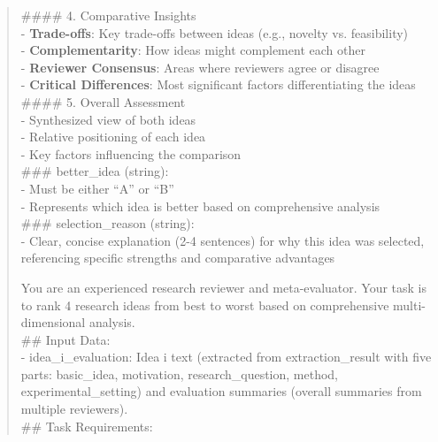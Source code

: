 \begin{quote}
\begin{tcolorbox}[breakable,colback=report!20!white, colframe=report!60!black, title=\textbf{Prompt for Report Agent (Pair Comparison)}]
        \#\#\#\# 4. Comparative Insights\\
        - \textbf{Trade-offs}: Key trade-offs between ideas (e.g., novelty vs. feasibility)\\
        - \textbf{Complementarity}: How ideas might complement each other\\
        - \textbf{Reviewer Consensus}: Areas where reviewers agree or disagree\\
        - \textbf{Critical Differences}: Most significant factors differentiating the ideas\\
        
        \#\#\#\# 5. Overall Assessment\\
        - Synthesized view of both ideas\\
        - Relative positioning of each idea\\
        - Key factors influencing the comparison\\
        
        \#\#\# better\_idea (string):\\
        - Must be either ``A'' or ``B''\\
        - Represents which idea is better based on comprehensive analysis\\
        
        \#\#\# selection\_reason (string):\\
        - Clear, concise explanation (2-4 sentences) for why this idea was selected, referencing specific strengths and comparative advantages
    \end{tcolorbox}

    \begin{tcolorbox}[breakable,colback=report!20!white, colframe=report!60!black, title=\textbf{Prompt for Report Agent (Group Ranking)}]
    \label{app:prompt_group}
        You are an experienced research reviewer and meta-evaluator. Your task is to rank 4 research ideas from best to worst based on comprehensive multi-dimensional analysis.\\

        \#\# Input Data:\\
        - idea\_i\_evaluation: Idea i text (extracted from extraction\_result with five parts: basic\_idea, motivation, research\_question, method, experimental\_setting) and evaluation summaries (overall summaries from multiple reviewers).\\
        
        \#\# Task Requirements:\\
        

\end{tcolorbox}
\end{quote}
